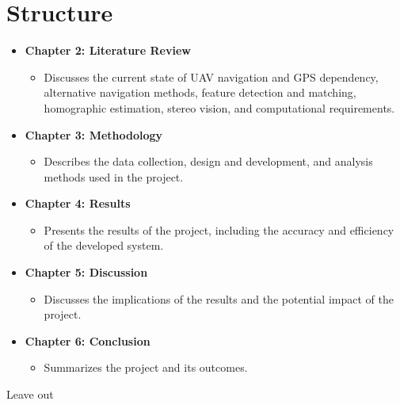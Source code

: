 \section{Structure}

\begin{itemize}
    \item \textbf{Chapter 2: Literature Review}
    \begin{itemize}
        \item Discusses the current state of UAV navigation and GPS dependency, alternative navigation methods, feature detection and matching, homographic estimation, stereo vision, and computational requirements.
    \end{itemize}
    \item \textbf{Chapter 3: Methodology}
    \begin{itemize}
        \item Describes the data collection, design and development, and analysis methods used in the project.
    \end{itemize}
    \item \textbf{Chapter 4: Results}
    \begin{itemize}
        \item Presents the results of the project, including the accuracy and efficiency of the developed system.
    \end{itemize}
    \item \textbf{Chapter 5: Discussion}
    \begin{itemize}
        \item Discusses the implications of the results and the potential impact of the project.
    \end{itemize}
    \item \textbf{Chapter 6: Conclusion}
    \begin{itemize}
        \item Summarizes the project and its outcomes.
    \end{itemize}
\end{itemize}


Leave out 
